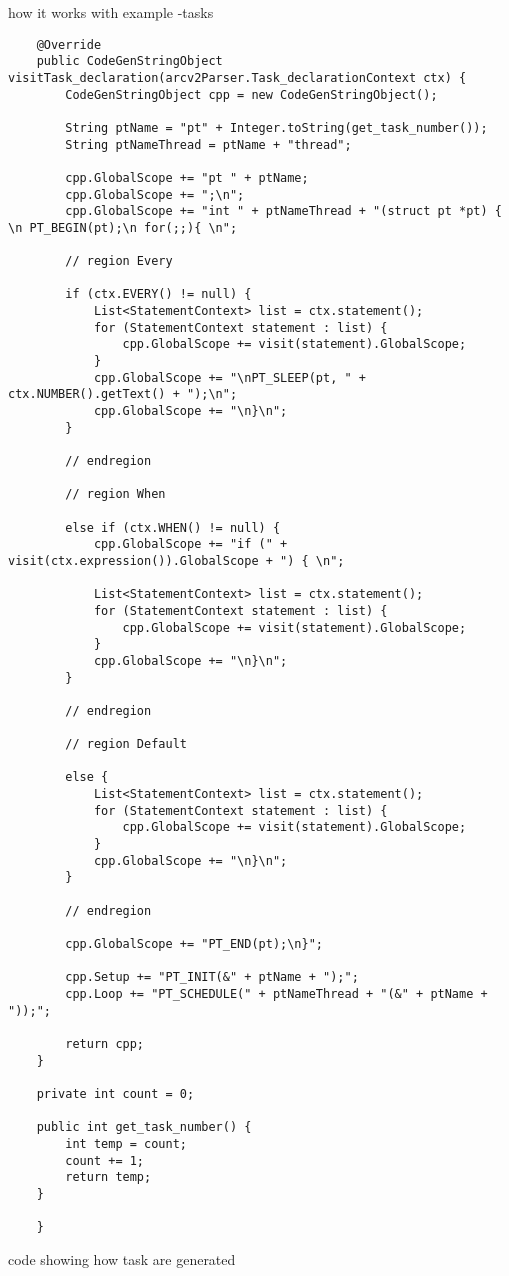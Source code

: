 how it works with example
    -tasks
    \begin{listing}[htb!]
        \begin{verbatim}
    @Override
    public CodeGenStringObject visitTask_declaration(arcv2Parser.Task_declarationContext ctx) {
        CodeGenStringObject cpp = new CodeGenStringObject();

        String ptName = "pt" + Integer.toString(get_task_number());
        String ptNameThread = ptName + "thread";

        cpp.GlobalScope += "pt " + ptName;
        cpp.GlobalScope += ";\n";
        cpp.GlobalScope += "int " + ptNameThread + "(struct pt *pt) { \n PT_BEGIN(pt);\n for(;;){ \n";

        // region Every

        if (ctx.EVERY() != null) {
            List<StatementContext> list = ctx.statement();
            for (StatementContext statement : list) {
                cpp.GlobalScope += visit(statement).GlobalScope;
            }
            cpp.GlobalScope += "\nPT_SLEEP(pt, " + ctx.NUMBER().getText() + ");\n";
            cpp.GlobalScope += "\n}\n";
        }

        // endregion

        // region When

        else if (ctx.WHEN() != null) {
            cpp.GlobalScope += "if (" + visit(ctx.expression()).GlobalScope + ") { \n";

            List<StatementContext> list = ctx.statement();
            for (StatementContext statement : list) {
                cpp.GlobalScope += visit(statement).GlobalScope;
            }
            cpp.GlobalScope += "\n}\n";
        }

        // endregion

        // region Default

        else {
            List<StatementContext> list = ctx.statement();
            for (StatementContext statement : list) {
                cpp.GlobalScope += visit(statement).GlobalScope;
            }
            cpp.GlobalScope += "\n}\n";
        }

        // endregion

        cpp.GlobalScope += "PT_END(pt);\n}";

        cpp.Setup += "PT_INIT(&" + ptName + ");";
        cpp.Loop += "PT_SCHEDULE(" + ptNameThread + "(&" + ptName + "));";

        return cpp;
    }

    private int count = 0;

    public int get_task_number() {
        int temp = count;
        count += 1;
        return temp;
    }

    }
        \end{verbatim}
        \caption{code showing how task are generated}
        \label{lst:codeGenTask}
    \end{listing}


